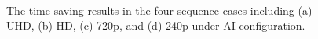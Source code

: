 \documentclass[lettersize,journal]{IEEEtran}
\begin{document}
\begin{figure}[!hb]
	\centering
	 \hspace{2pt}
	 \vspace{-4pt} \\
	 \hspace{2pt}
	\caption{The time-saving results in the four sequence cases including (a) UHD, (b) HD, (c) 720p, and (d) 240p under AI configuration.}
	\label{Time curves}
\end{figure}
\end{document}
